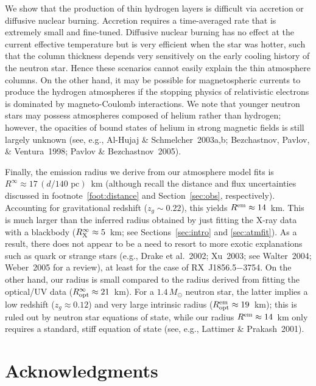 \documentclass[useAMS,usegraphicx]{mn2e}
\newcommand{\etal}{et al.}
\newcommand{\rxjw}{RX~J1856.5$-$3754}
\newcommand{\zg}{z_g}
\newcommand{\rem}{\ensuremath{R^{\rm em}}}
\newcommand{\rinfty}{\ensuremath{R^{\infty}}}
\begin{document}
We show that the production of thin hydrogen layers
is difficult via accretion or diffusive nuclear burning.
Accretion requires a time-averaged rate that is extremely small and
fine-tuned.  Diffusive nuclear burning has no effect at the current
effective temperature but is very efficient when the star was hotter,
such that the column thickness depends very sensitively on the early cooling
history of the neutron star.
Hence these scenarios cannot easily explain the thin atmosphere columns.
On the other hand, it may be possible for magnetospheric currents to produce
the hydrogen atmospheres if the stopping physics of relativistic
electrons is dominated by magneto-Coulomb interactions.
We note that younger neutron stars may possess
atmospheres composed of helium rather than hydrogen;
however, the opacities of bound states of helium in strong magnetic
fields is still largely unknown (see, e.g., Al-Hujaj \& Schmelcher~2003a,b;
Bezchastnov, Pavlov, \& Ventura~1998; Pavlov \& Bezchastnov~2005).

Finally, the emission radius we derive from our atmosphere model fits is
$\rinfty\approx 17\,(d/140\mbox{ pc})$~km
(although recall the distance and flux uncertainties discussed in
footnote~\ref{foot:distance} and Section~\ref{sec:obs}, respectively).
Accounting for gravitational redshift ($\zg\sim 0.22$),
this yields $\rem\approx 14$~km.
This is much larger than the inferred radius obtained by just fitting the
X-ray data with a blackbody
($\rinfty_{\rm X}\approx 5$~km; see Sections~\ref{sec:intro} and \ref{sec:atmfit}).
As a result, there does not appear to be a need to resort to more exotic
explanations such as quark or strange stars (e.g., Drake \etal~2002; Xu~2003;
see Walter~2004; Weber~2005 for a review), at least for the case of \rxjw.
On the other hand, our radius is small compared to the radius derived from
fitting the optical/UV data ($\rinfty_{\rm opt}\approx 21$~km).
For a $1.4\,M_\odot$ neutron star, the latter implies a low redshift
($\zg\approx 0.12$) and very large intrinsic radius
($\rem_{\rm opt}\approx 19$~km);
this is ruled out by neutron star equations of state,
while our radius $\rem\approx 14$~km only requires a standard, stiff
equation of state (see, e.g., Lattimer \& Prakash~2001).

\section*{Acknowledgments}
\end{document}
